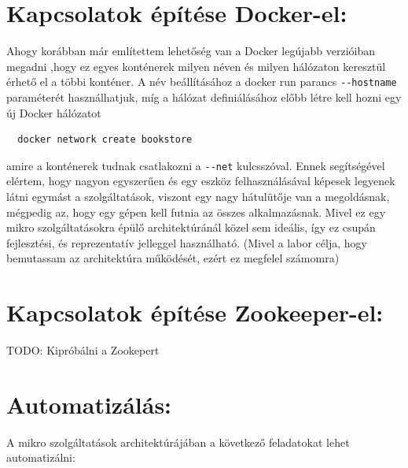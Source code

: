 \documentclass[11pt,magyar,a4paper,oneside,]{report}
\begin{document}
\section{Kapcsolatok építése
Docker-el:}\label{kapcsolatok-uxe9puxedtuxe9se-docker-el}

Ahogy korábban már említettem lehetőség van a Docker legújabb verzióiban
megadni ,hogy ez egyes konténerek milyen néven és milyen hálózaton
keresztül érhető el a többi konténer. A név beállításához a docker run
parancs \texttt{-\/-hostname} paraméterét használhatjuk, míg a hálózat
definiálásához előbb létre kell hozni egy új Docker hálózatot

\begin{verbatim}
  docker network create bookstore
\end{verbatim}

amire a konténerek tudnak csatlakozni a \texttt{-\/-net} kulcsszóval.
Ennek segítségével elértem, hogy nagyon egyszerűen és egy eszköz
felhasználásával képesek legyenek látni egymást a szolgáltatások,
viszont egy nagy hátulütője van a megoldásnak, mégpedig az, hogy egy
gépen kell futnia az összes alkalmazásnak. Mivel ez egy mikro
szolgáltatásokra épülő architektúránál közel sem ideális, így ez csupán
fejlesztési, és reprezentatív jelleggel használható. (Mivel a labor
célja, hogy bemutassam az architektúra működését, ezért ez megfelel
számomra)

\section{Kapcsolatok építése
Zookeeper-el:}\label{kapcsolatok-uxe9puxedtuxe9se-zookeeper-el}

TODO: Kipróbálni a Zookepert

\section{Automatizálás:}\label{automatizuxe1luxe1s}

A mikro szolgáltatások architektúrájában a következő feladatokat lehet
automatizálni:
\end{document}

